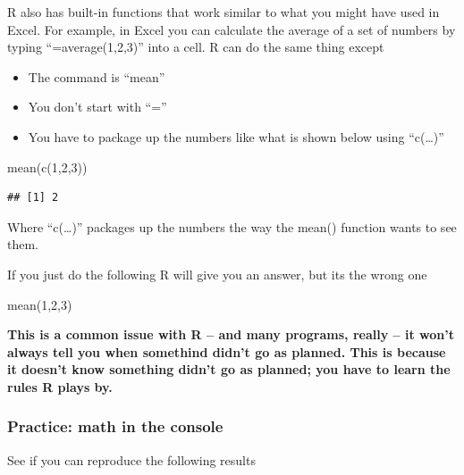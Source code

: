 \documentclass[
]{book}
\newenvironment{Shaded}{\begin{snugshade}}{\end{snugshade}}
\newcommand{\DecValTok}[1]{\textcolor[rgb]{0.00,0.00,0.81}{#1}}
\newcommand{\FunctionTok}[1]{\textcolor[rgb]{0.00,0.00,0.00}{#1}}
\newcommand{\NormalTok}[1]{#1}
\providecommand{\tightlist}{%
  \setlength{\itemsep}{0pt}\setlength{\parskip}{0pt}}
\begin{document}
R also has built-in functions that work similar to what you might have used in Excel. For example, in Excel you can calculate the average of a set of numbers by typing ``=average(1,2,3)'' into a cell. R can do the same thing except

\begin{itemize}
\tightlist
\item
  The command is ``mean''
\item
  You don't start with ``=''
\item
  You have to package up the numbers like what is shown below using ``c(\ldots)''
\end{itemize}

\begin{Shaded}
\begin{Highlighting}[]
\FunctionTok{mean}\NormalTok{(}\FunctionTok{c}\NormalTok{(}\DecValTok{1}\NormalTok{,}\DecValTok{2}\NormalTok{,}\DecValTok{3}\NormalTok{))}
\end{Highlighting}
\end{Shaded}

\begin{verbatim}
## [1] 2
\end{verbatim}

Where ``c(\ldots)'' packages up the numbers the way the mean() function wants to see them.

If you just do the following R will give you an answer, but its the wrong one

\begin{Shaded}
\begin{Highlighting}[]
\FunctionTok{mean}\NormalTok{(}\DecValTok{1}\NormalTok{,}\DecValTok{2}\NormalTok{,}\DecValTok{3}\NormalTok{)}
\end{Highlighting}
\end{Shaded}

\textbf{This is a common issue with R -- and many programs, really -- it won't always tell you when somethind didn't go as planned. This is because it doesn't know something didn't go as planned; you have to learn the rules R plays by.}

\hypertarget{practice-math-in-the-console}{%
\subsubsection{Practice: math in the console}\label{practice-math-in-the-console}}

See if you can reproduce the following results
\end{document}
